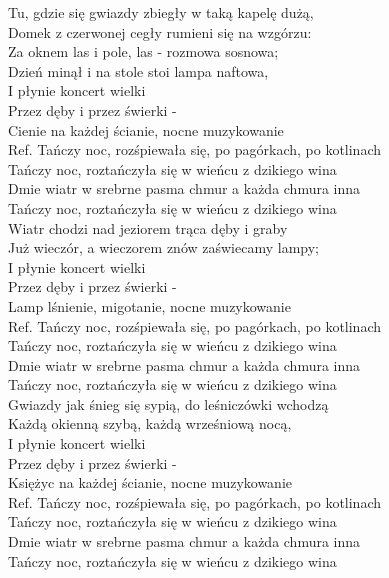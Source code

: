 
Tu, gdzie się gwiazdy zbiegły w taką kapelę dużą, \tab{}\\
Domek z czerwonej cegły rumieni się na wzgórzu: \tab{}\\
Za oknem las i pole, las - rozmowa sosnowa; \tab{}\\
Dzień minął i na stole stoi lampa naftowa, \tab{}\\
\hops
I płynie koncert wielki \tab{}\tab{}\\
Przez dęby i przez świerki - \tab{}\\
Cienie na każdej ścianie, nocne muzykowanie \\
\hops
Ref. Tańczy noc, rozśpiewała się, po pagórkach, po kotlinach \\
 Tańczy noc, roztańczyła się w wieńcu z dzikiego wina \\
 Dmie wiatr w srebrne pasma chmur a każda chmura inna \\
 Tańczy noc, roztańczyła się w wieńcu z dzikiego wina \\
\hops
Wiatr chodzi  nad jeziorem trąca  dęby i graby \\
Już wieczór, a wieczorem znów zaświecamy lampy; \\
I płynie koncert wielki \\
Przez dęby i przez świerki - \\
Lamp lśnienie, migotanie, nocne muzykowanie \\
\hops
Ref. Tańczy noc, rozśpiewała się, po pagórkach, po kotlinach\\
 Tańczy noc, roztańczyła się w wieńcu z dzikiego wina \\
 Dmie wiatr w srebrne pasma chmur a każda chmura inna \\
 Tańczy noc, roztańczyła się w wieńcu z dzikiego wina \\
\hops
Gwiazdy jak śnieg się sypią, do leśniczówki wchodzą \\
Każdą okienną szybą, każdą wrześniową nocą, \\
I płynie koncert wielki \\
Przez dęby i przez świerki - \\
Księżyc na każdej ścianie, nocne muzykowanie \\
\hops
Ref. Tańczy noc, rozśpiewała się, po pagórkach, po kotlinach\\
 Tańczy noc, roztańczyła się w wieńcu z dzikiego wina \\
 Dmie wiatr w srebrne pasma chmur a każda chmura inna \\
 Tańczy noc, roztańczyła się w wieńcu z dzikiego wina \\
